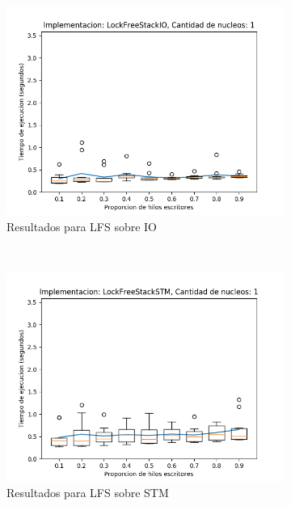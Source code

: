 \begin{appendices}
\begin{figure}[H]
\begin{subfigure}[b]{0.49\textwidth}
        \includegraphics[width=\textwidth]{images/pushPercentages/plots/expLFSIO-1}
        \caption{Resultados para LFS sobre IO}
        \label{subfig:pushPercentages-lfsio-1}
    \end{subfigure}
    ~
    \begin{subfigure}[b]{0.49\textwidth}
        \includegraphics[width=\textwidth]{images/pushPercentages/plots/expLFSSTM-1}
        \caption{Resultados para LFS sobre STM}
        \label{subfig:pushPercentages-lfsstm-1}
    \end{subfigure}
    \begin{subfigure}[b]{0.49\textwidth}

\end{subfigure}
\end{figure}
\end{appendices}
